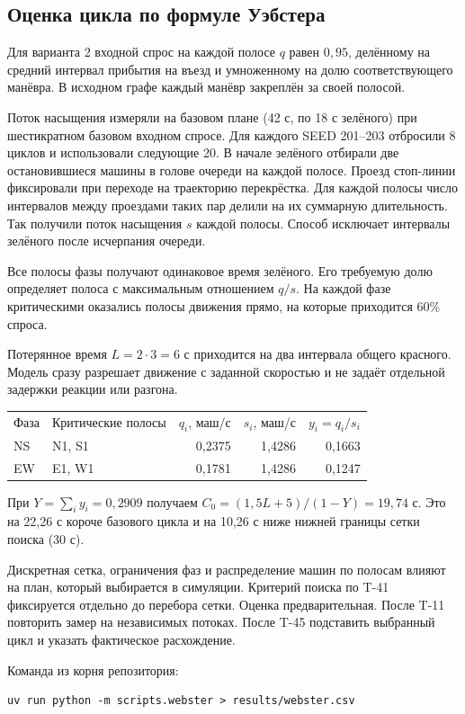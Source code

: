 \subsection{Оценка цикла по формуле Уэбстера}

Для варианта 2 входной спрос на каждой полосе $q$ равен $0{,}95$,
делённому на средний интервал прибытия на въезд и умноженному
на долю соответствующего манёвра. В исходном графе каждый манёвр
закреплён за своей полосой.

Поток насыщения измеряли на базовом плане (42 с, по 18 с зелёного)
при шестикратном базовом входном спросе. Для каждого SEED 201–203
отбросили 8 циклов и использовали следующие 20. В начале зелёного
отбирали две остановившиеся машины в голове очереди на каждой полосе.
Проезд стоп-линии фиксировали при переходе на траекторию перекрёстка.
Для каждой полосы число интервалов между проездами таких пар делили
на их суммарную длительность. Так получили поток насыщения $s$ каждой
полосы. Способ исключает интервалы зелёного после исчерпания очереди.

Все полосы фазы получают одинаковое время зелёного. Его требуемую долю
определяет полоса с максимальным отношением $q/s$. На каждой фазе
критическими оказались полосы движения прямо, на которые приходится 60\% спроса.

Потерянное время $L=2\cdot3=6$ с приходится на два интервала общего красного.
Модель сразу разрешает движение с заданной скоростью и не задаёт отдельной
задержки реакции или разгона.

\begin{center}
\begin{tabular}{llrrr}
Фаза & Критические полосы & $q_i$, маш/с & $s_i$, маш/с & $y_i=q_i/s_i$ \\
NS & N1, S1 & 0,2375 & 1,4286 & 0,1663 \\
EW & E1, W1 & 0,1781 & 1,4286 & 0,1247 \\
\end{tabular}
\end{center}

При $Y=\sum_i y_i=0{,}2909$ получаем
$C_0=(1{,}5L+5)/(1-Y)=19{,}74$ с. Это на 22,26 с короче базового
цикла и на 10,26 с ниже нижней границы сетки поиска (30 с).

Дискретная сетка, ограничения фаз и распределение машин по полосам
влияют на план, который выбирается в симуляции. Критерий поиска по T-41
фиксируется отдельно до перебора сетки.
Оценка предварительная. После T-11 повторить замер на независимых потоках.
После T-45 подставить выбранный цикл и указать фактическое расхождение.

Команда из корня репозитория:
\begin{verbatim}
uv run python -m scripts.webster > results/webster.csv
\end{verbatim}
